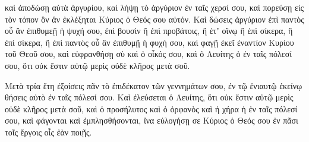 {καὶ ἀποδώσῃ αὐτὰ ἀργυρίου, καὶ λήψῃ τὸ ἀργύριον ἐν ταῖς χερσί σου, καὶ πορεύσῃ εἰς τὸν τόπον ὃν ἂν ἐκλέξηται Κύριος ὁ Θεός σου αὐτόν.
Καὶ δώσεις ἀργύριον ἐπὶ παντὸς οὗ ἂν ἐπιθυμεῇ ἡ ψυχή σου, ἐπὶ βουσὶν ἤ ἐπὶ προβάτοις, ἢ ἐτʼ οἴνῳ ἢ ἐπὶ σίκερα, ἢ ἐπὶ σίκερα, ἢ ἐπὶ παντὸς οὗ ἂν ἐπιθυμῇ ἡ φυχή σου, καὶ φαγῇ ἐκεῖ ἐναντίον Κυρίου τοῦ Θεοῦ σου, καὶ εὐφρανθήσῃ σὺ καὶ ὁ οἶκός σου,
καὶ ὁ Λευίτης ὁ ἐν ταῖς πόλεσί σου, ὅτι οὐκ ἔστιν αὐτῷ μερὶς οὐδὲ κλῆρος μετὰ σοῦ.
\par }{\PP {}Μετὰ τρία ἔτη ἐξοίσεις πᾶν τὸ ἐπιδέκατον τῶν γεννημάτων σου, ἐν τῷ ἐνιαυτῷ ἐκείνῳ θήσεις αὐτὸ ἐν ταῖς πόλεσί σου.
Καὶ ἐλεύσεται ὁ Λευίτης, ὅτι οὐκ ἔστιν αὐτῷ μερὶς οὐδὲ κλῆρος μετὰ σοῦ, καὶ ὁ προσήλυτος καὶ ὁ ὀρφανὸς καὶ ἡ χήρα ἡ ἐν ταῖς πόλεσί σου, καὶ φάγονται καὶ ἐμπλησθήσονται, ἵνα εὐλογήσῃ σε Κύριος ὁ Θεός σου ἐν πᾶσι τοῖς ἔργοις οἷς ἐὰν ποιῇς.

}
